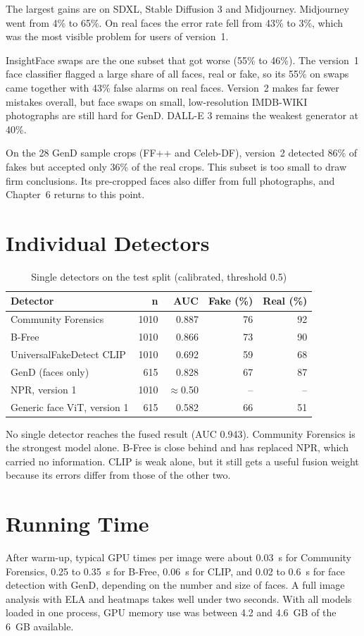 \documentclass[12pt,a4paper,oneside]{report}
\begin{document}
The largest gains are on SDXL, Stable Diffusion 3 and Midjourney. Midjourney went from 4\% to 65\%. On real faces the error rate fell from 43\% to 3\%, which was the most visible problem for users of version~1.

InsightFace swaps are the one subset that got worse (55\% to 46\%). The version~1 face classifier flagged a large share of all faces, real or fake, so its 55\% on swaps came together with 43\% false alarms on real faces. Version~2 makes far fewer mistakes overall, but face swaps on small, low-resolution IMDB-WIKI photographs are still hard for GenD. DALL-E 3 remains the weakest generator at 40\%.

On the 28 GenD sample crops (FF++ and Celeb-DF), version~2 detected 86\% of fakes but accepted only 36\% of the real crops. This subset is too small to draw firm conclusions. Its pre-cropped faces also differ from full photographs, and Chapter~6 returns to this point.

\section{Individual Detectors}
\begin{table}[H]
\centering
\caption{Single detectors on the test split (calibrated, threshold 0.5)}\label{tab:single}
\begin{tabular}{@{}lrrrr@{}}
\toprule
Detector & n & AUC & Fake (\%) & Real (\%) \\
\midrule
Community Forensics & 1010 & 0.887 & 76 & 92 \\
B-Free & 1010 & 0.866 & 73 & 90 \\
UniversalFakeDetect CLIP & 1010 & 0.692 & 59 & 68 \\
GenD (faces only) & 615 & 0.828 & 67 & 87 \\
\midrule
NPR, version 1 & 1010 & $\approx$0.50 & -- & -- \\
Generic face ViT, version 1 & 615 & 0.582 & 66 & 51 \\
\bottomrule
\end{tabular}
\end{table}

No single detector reaches the fused result (AUC 0.943). Community Forensics is the strongest model alone. B-Free is close behind and has replaced NPR, which carried no information. CLIP is weak alone, but it still gets a useful fusion weight because its errors differ from those of the other two.

\section{Running Time}
After warm-up, typical GPU times per image were about 0.03~s for Community Forensics, 0.25 to 0.35~s for B-Free, 0.06~s for CLIP, and 0.02 to 0.6~s for face detection with GenD, depending on the number and size of faces. A full image analysis with ELA and heatmaps takes well under two seconds. With all models loaded in one process, GPU memory use was between 4.2 and 4.6~GB of the 6~GB available.
\end{document}
